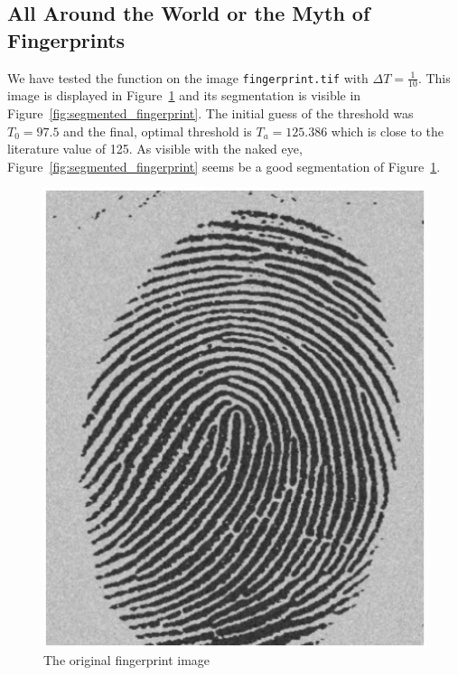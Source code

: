 \subsection{All Around the World or the Myth of Fingerprints}
We have tested the function on the image \texttt{fingerprint.tif} with \(\Delta T = \frac{1}{10}\). 
This image is displayed in Figure~\ref{fig:original_fingerprint} and its segmentation is visible in Figure~\ref{fig:segmented_fingerprint}.
The initial guess of the threshold was \(T_0 = 97.5\) and the final, optimal threshold is \(T_a = 125.386\) which is close to the literature value of 125.\cite[p. 742]{gonzalez2002digital}
As visible with the naked eye, Figure~\ref{fig:segmented_fingerprint} seems be a good segmentation of Figure~\ref{fig:original_fingerprint}.
\begin{figure}[htb]
 \centering
 \includegraphics[width=\linewidth]{original_fingerprint.eps}
 \caption{The original fingerprint image}
 \label{fig:original_fingerprint}
\end{figure}

